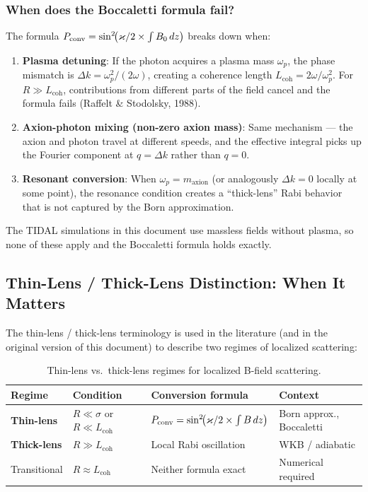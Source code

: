 \subsubsection{When does the Boccaletti formula fail?}

The formula $P_\mathrm{conv} = \sin^2\!\bigl(\varkappa/2 \times \int B_0\, dz\bigr)$ breaks down when:

\begin{enumerate}
  \item \textbf{Plasma detuning}: If the photon acquires a plasma mass $\omega_p$, the phase mismatch is
    $\Delta k = \omega_p^2/(2\omega)$, creating a coherence length $L_\text{coh} = 2\omega/\omega_p^2$. For $R \gg L_\text{coh}$, contributions
    from different parts of the field cancel and the formula fails (Raffelt \& Stodolsky, 1988).

  \item \textbf{Axion-photon mixing (non-zero axion mass)}: Same mechanism --- the axion and photon travel
    at different speeds, and the effective integral picks up the Fourier component at $q = \Delta k$
    rather than $q = 0$.

  \item \textbf{Resonant conversion}: When $\omega_p = m_\text{axion}$ (or analogously $\Delta k = 0$ locally at some point),
    the resonance condition creates a ``thick-lens'' Rabi behavior that is not captured by the
    Born approximation.
\end{enumerate}

The TIDAL simulations in this document use massless fields without plasma, so none of these
apply and the Boccaletti formula holds exactly.


\subsection{Thin-Lens / Thick-Lens Distinction: When It Matters}
\label{sec:thin-thick-lens}

The thin-lens / thick-lens terminology is used in the literature (and in the original
version of this document) to describe two regimes of localized scattering:

\begin{table}[htbp]
\centering
\caption{Thin-lens vs.\ thick-lens regimes for localized B-field scattering.}
\label{tab:lens-regimes}
\begin{tabular}{@{}llll@{}}
\toprule
Regime & Condition & Conversion formula & Context \\
\midrule
\textbf{Thin-lens}   & $R \ll \sigma$ or $R \ll L_\text{coh}$ & $P_\mathrm{conv} = \sin^2\!\bigl(\varkappa/2 \times \int B\, dz\bigr)$ & Born approx., Boccaletti \\
\textbf{Thick-lens}  & $R \gg L_\text{coh}$                   & Local Rabi oscillation                                      & WKB / adiabatic \\
Transitional          & $R \approx L_\text{coh}$               & Neither formula exact                                       & Numerical required \\
\bottomrule
\end{tabular}
\end{table}

